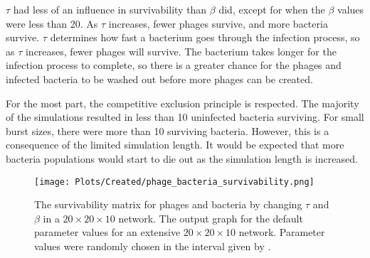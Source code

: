 $\tau$ had less of an influence in survivability than $\beta$ did, except for when the $\beta$ values were less than 20. 
As $\tau$ increases, fewer phages survive, and more bacteria survive. 
$\tau$ determines how fast a bacterium goes through the infection process, so as $\tau$ increases, fewer phages will survive. 
The bacterium takes longer for the infection process to complete, so there is a greater chance for the phages and infected bacteria to be washed out before more phages can be created. 

For the most part, the competitive exclusion principle is respected. 
The majority of the simulations resulted in less than 10 uninfected bacteria surviving. 
For small burst sizes, there were more than 10 surviving bacteria. 
However, this is a consequence of the limited simulation length. 
It would be expected that more bacteria populations would start to die out as the simulation length is increased. 

\begin{figure}[]
    \texttt{[image: Plots/Created/phage\_bacteria\_survivability.png]}
    \centering
    \caption{
        The survivability matrix for phages and bacteria by changing $\tau$ and $\beta$ in a $20\times 20\times 10$ network. 
        The output graph for the default parameter values for an extensive $20\times 20 \times 10$ network. 
        Parameter values were randomly chosen in the interval given by . 
    }
    \label{fig:created:survivability}
\end{figure}

